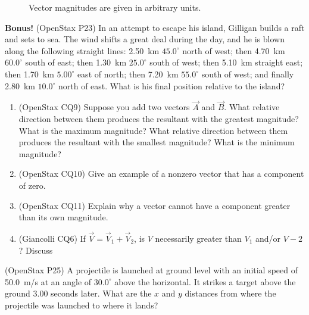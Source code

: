 \documentclass[10pt,twocolumn]{exam}
\def\answer#1{\footnotetext{#1}}
\def\myquestion{\question\stepcounter{footnote}}
\begin{document}
\begin{questions}
\begin{figure}[ht]
\begin{tikzpicture}
    \end{tikzpicture}
    \caption{Vector magnitudes are given in arbitrary units.}
    \label{3-35}
  \end{figure}

\myquestion \textbf{Bonus!} (OpenStax P23) In an attempt to escape his island, Gilligan builds a raft and sets to sea. The wind shifts a great deal during the day, and he is blown along the following straight lines: 2.50~km  $45.0^\circ$ north of west; then 4.70~km  $60.0^\circ$ south of east; then 1.30~km $25.0^\circ$ south of west; then 5.10~km  straight east; then 1.70~km  $5.00^\circ$ east of north; then 7.20~km  $55.0^\circ$ south of west; and finally 2.80~km  $10.0^\circ$ north of east. What is his final position relative to the island?


\begin{enumerate}[resume*]
  \item (OpenStax CQ9) Suppose you add two vectors $\vec{A}$ and $\vec{B}$. What relative direction between them produces the resultant with the greatest magnitude? What is the maximum magnitude? What relative direction between them produces the resultant with the smallest magnitude? What is the minimum magnitude?
  \item (OpenStax CQ10) Give an example of a nonzero vector that has a component of zero.
  \item (OpenStax CQ11) Explain why a vector cannot have a component greater than its own magnitude.
  \item (Giancolli CQ6) If $\vec{V}=\vec{V}_1+\vec{V}_2$, is $V$ necessarily greater than $V_1$ and/or $V-2$?  Discuss
\end{enumerate}




\myquestion (OpenStax P25) \hfill
A projectile is launched at ground level with an initial speed of 50.0~m/s at an angle of $30.0^\circ$ above the horizontal. It strikes a target above the ground 3.00 seconds later. What are the $x$ and $y$ distances from where the projectile was launched to where it lands? \answer{$x=\SI{1.30e2}{m}$; $y=\SI{30.9}{m}$}


\end{questions}
\end{document}
